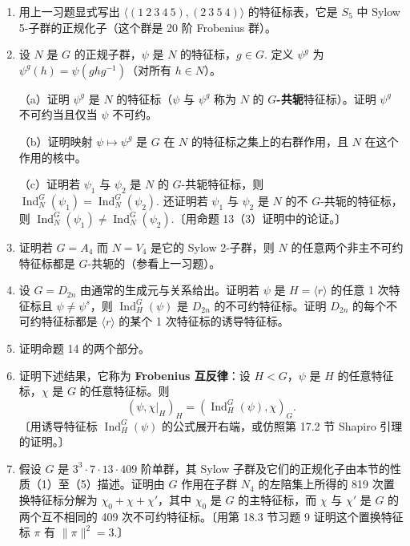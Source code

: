 \begin{enumerate}
\item 用上一习题显式写出 \(\langle(1\ 2\ 3\ 4\ 5), (2\ 3\ 5\ 4)\rangle\) 的特征标表，它是 \(S_5\) 中 Sylow 5-子群的正规化子（这个群是 20 阶 Frobenius 群）。

\item 设 \(N\) 是 \(G\) 的正规子群，\(\psi\) 是 \(N\) 的特征标，\(g \in G\). 定义 \(\psi^g\) 为 \(\psi^g(h) = \psi(ghg^{-1})\)（对所有 \(h \in N\)）。

（a）证明 \(\psi^g\) 是 \(N\) 的特征标（\(\psi\) 与 \(\psi^g\) 称为 \(N\) 的 \textbf{\(G\)-共轭}特征标）。证明 \(\psi^g\) 不可约当且仅当 \(\psi\) 不可约。

（b）证明映射 \(\psi \mapsto \psi^g\) 是 \(G\) 在 \(N\) 的特征标之集上的右群作用，且 \(N\) 在这个作用的核中。

（c）证明若 \(\psi_1\) 与 \(\psi_2\) 是 \(N\) 的 \(G\)-共轭特征标，则 \(\operatorname{Ind}_N^G(\psi_1) = \operatorname{Ind}_N^G(\psi_2)\). 还证明若 \(\psi_1\) 与 \(\psi_2\) 是 \(N\) 的不 \(G\)-共轭的特征标，则 \(\operatorname{Ind}_N^G(\psi_1) \neq \operatorname{Ind}_N^G(\psi_2)\).〔用命题 13（3）证明中的论证。〕

\item 证明若 \(G = A_4\) 而 \(N = V_4\) 是它的 Sylow 2-子群，则 \(N\) 的任意两个非主不可约特征标都是 \(G\)-共轭的（参看上一习题）。

\item 设 \(G = D_{2n}\) 由通常的生成元与关系给出。证明若 \(\psi\) 是 \(H = \langle r\rangle\) 的任意 1 次特征标且 \(\psi \neq \psi^s\)，则 \(\operatorname{Ind}_H^G(\psi)\) 是 \(D_{2n}\) 的不可约特征标。证明 \(D_{2n}\) 的每个不可约特征标都是 \(\langle r\rangle\) 的某个 1 次特征标的诱导特征标。

\item 证明命题 14 的两个部分。

\item 证明下述结果，它称为 \textbf{Frobenius 互反律}：设 \(H < G\)，\(\psi\) 是 \(H\) 的任意特征标，\(\chi\) 是 \(G\) 的任意特征标。则
\[
(\psi, \chi|_H)_H = (\operatorname{Ind}_H^G(\psi), \chi)_G.
\]
〔用诱导特征标 \(\operatorname{Ind}_H^G(\psi)\) 的公式展开右端，或仿照第 17.2 节 Shapiro 引理的证明。〕

\item 假设 \(G\) 是 \(3^3\cdot 7\cdot 13\cdot 409\) 阶单群，其 Sylow 子群及它们的正规化子由本节的性质（1）至（5）描述。证明由 \(G\) 作用在子群 \(N_4\) 的左陪集上所得的 819 次置换特征标分解为 \(\chi_0+\chi+\chi'\)，其中 \(\chi_0\) 是 \(G\) 的主特征标，而 \(\chi\) 与 \(\chi'\) 是 \(G\) 的两个互不相同的 409 次不可约特征标。〔用第 18.3 节习题 9 证明这个置换特征标 \(\pi\) 有 \(\|\pi\|^2 = 3\).〕
\end{enumerate}
